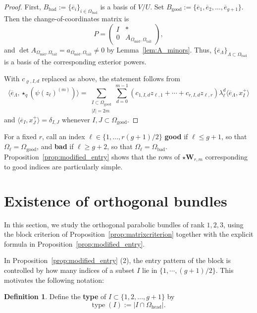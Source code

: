 \documentclass[12pt, letterpaper]{amsart}
\theoremstyle{definition}
\newtheorem{definition}[theorem]{Definition}
\newcommand{\bW}{\mathbf{W} }
\newcommand{\Om}{\Omega}
\newcommand{\lbd}{\lambda}
\def\type{\mathrm{type}\;}
\begin{document}
\begin{proof}
First, \(B_{\mathrm{bad}} := \{\overline e_i\}_{i \in \Om_{\mathrm{bad}}}\) is a basis of \(V/U\). Set \(B_{\mathrm{good}} := \{\overline e_1, \overline e_2, \dots, \overline e_{g+1}\}\). Then the change-of-coordinates matrix is
\[P = \begin{pmatrix} I & *\\ 0 & A_{\Om_{\mathrm{mid}}, \Om_{\mathrm{tail}}} \end{pmatrix},\]
and \(\det A_{\Om_{\mathrm{mid}}, \Om_{\mathrm{tail}}} = a_{\Om_{\mathrm{mid}}, \Om_{\mathrm{tail}}} \ne 0\) by Lemma~\ref{lem:A_minors}. Thus, \(\{\overline e_\Lambda\}_{\Lambda \subset \Omega_{\mathrm{bad}}}\) is a basis of the corresponding exterior powers.

With \(c_{\varrho,I,d}\) replaced as above, the statement follows from
\[
\langle\overline e_\Lambda,\star_q(\psi(z_\ell)^{(m)})\rangle=\sum_{\substack{I\subset\Om_{\mathrm{good}}\\|I|=2m}}\sum_{d=0}^{m-1}(c_{1,I,d}z_{\ell,1}+\cdots+c_{r,I,d}z_{\ell,r})\lbd_\ell^d\langle\overline e_\Lambda, x_I^+\rangle
\]
and \(\langle\overline e_I,x_J^+\rangle=\delta_{I,J}\) whenever \(I,J\subset\Om_{\mathrm{good}}\).
\end{proof}

For a fixed \(r\), call an index \(\ell\in\{1,\dots,r(g+1)/2\}\) \textbf{good} if \(\ell\le g+1\), so that \(\Om_\ell = \Om_{\mathrm{good}}\), and \textbf{bad} if \(\ell\ge g+2\), so that \(\Om_\ell = \Om_{\mathrm{bad}}\). Proposition~\ref{prop:modified_entry} shows that the rows of \(\star \bW_{r, m}\) corresponding to good indices are particularly simple.

\section{Existence of orthogonal bundles}\label{sec:existence}

In this section, we study the orthogonal parabolic bundles of rank \(1,2,3\), using the block criterion of Proposition~\ref{prop:matrixcriterion} together with the explicit formula in Proposition~\ref{prop:modified_entry}.

In Proposition~\ref{prop:modified_entry} (2), the entry pattern of the block is controlled by how many indices of a subset \(I\) lie in \(\{1,\cdots,(g+1)/2\}\). This motivates the following notation:

\begin{definition}\label{def:type}
Define the \textbf{type} of \(I \subset \{1, 2, \dots, g+1\}\) by
\[\type(I):=\left|I\cap\Om_{\mathrm{head}}\right|.\]
\end{definition}
\end{document}

